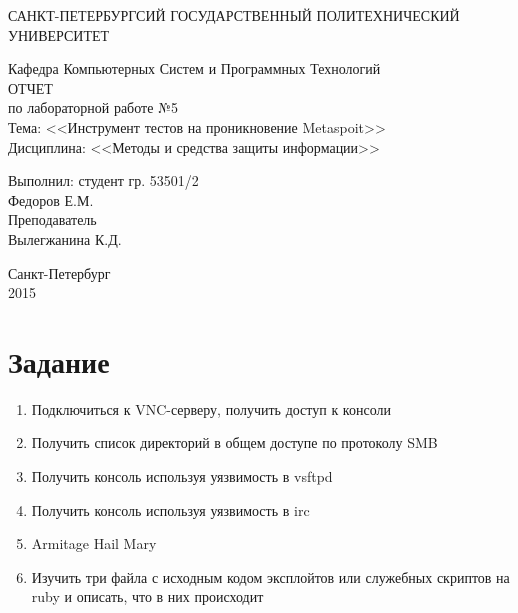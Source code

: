 \documentclass[utf8x, 12pt]{G7-32}
\begin{document}
\frontmatter 


\begin{center} 

\large САНКТ-ПЕТЕРБУРГСИЙ ГОСУДАРСТВЕННЫЙ ПОЛИТЕХНИЧЕСКИЙ УНИВЕРСИТЕТ

\large Кафедра Компьютерных Систем и Программных Технологий \\[5.5cm] 

\huge ОТЧЕТ \\[0.6cm] %
\large по лабораторной работе №5\\
\large Тема: <<Инструмент тестов на проникновение Metaspoit>>\\
\large Дисциплина: <<Методы и средства защиты информации>>\\[3.7cm]

\end{center} 

\begin{flushright}
Выполнил: студент гр. 53501/2 \\
Федоров Е.М. \\[1.2cm]


Преподаватель \\
Вылегжанина К.Д.
\end{flushright}


\vfill 

\begin{center} 
\large Санкт-Петербург \\
2015
\end{center} 

\thispagestyle{empty}



\thispagestyle{empty}
\setcounter{page}{0}
\tableofcontents
\clearpage
\mainmatter


\chapter{Задание}

\begin{enumerate}
	\item Подключиться к VNC-серверу, получить доступ к консоли
	\item Получить список директорий в общем доступе по протоколу SMB
	\item Получить консоль используя уязвимость в vsftpd
	\item Получить консоль используя уязвимость в irc
	\item Armitage Hail Mary
	\item Изучить три файла с исходным кодом эксплойтов или служебных скриптов на ruby и описать, что в них происходит
\end{enumerate}
\end{document}
